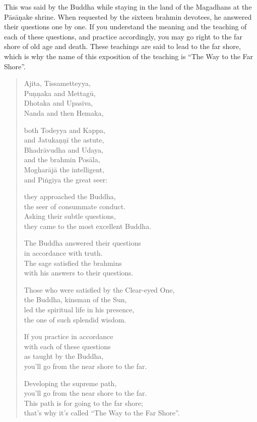 \documentclass[12pt,openany]{book}%
\begin{document}
This was said by the Buddha while staying in the land of the Magadhans at the \textsanskrit{Pāsāṇake} shrine. When requested by the sixteen brahmin devotees, he answered their questions one by one. If you understand the meaning and the teaching of each of these questions, and practice accordingly, you may go right to the far shore of old age and death. These teachings are said to lead to the far shore, which is why the name of this exposition of the teaching is “The Way to the Far Shore”. 

\begin{verse}%
Ajita, Tissametteyya, \\
\textsanskrit{Puṇṇaka} and \textsanskrit{Mettagū}, \\
Dhotaka and Upasiva, \\
Nanda and then Hemaka, 

both Todeyya and Kappa, \\
and \textsanskrit{Jatukaṇṇī} the astute, \\
\textsanskrit{Bhadrāvudha} and Udaya, \\
and the brahmin \textsanskrit{Posāla}, \\
\textsanskrit{Mogharājā} the intelligent, \\
and \textsanskrit{Piṅgiya} the great seer: 

they approached the Buddha, \\
the seer of consummate conduct. \\
Asking their subtle questions, \\
they came to the most excellent Buddha. 

The Buddha answered their questions \\
in accordance with truth. \\
The sage satisfied the brahmins \\
with his answers to their questions. 

Those who were satisfied by the Clear-eyed One, \\
the Buddha, kinsman of the Sun, \\
led the spiritual life in his presence, \\
the one of such splendid wisdom. 

If you practice in accordance \\
with each of these questions \\
as taught by the Buddha, \\
you’ll go from the near shore to the far. 

Developing the supreme path, \\
you’ll go from the near shore to the far. \\
This path is for going to the far shore; \\
that’s why it’s called “The Way to the Far Shore”. 

%
\end{verse}
\end{document}
